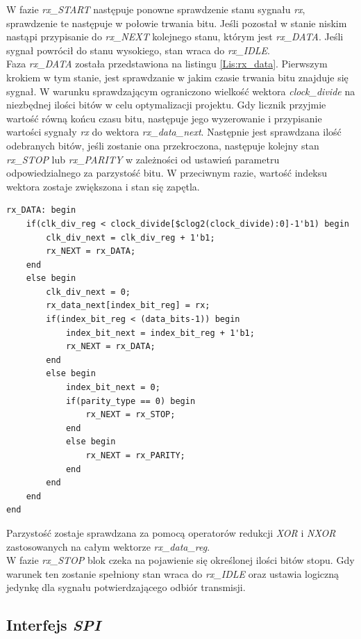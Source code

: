 \documentclass[11pt,a4paper]{article}
\begin{document}
W fazie \textit{rx\_START} następuje ponowne sprawdzenie stanu sygnału \textit{rx}, sprawdzenie te następuje w połowie trwania bitu. Jeśli pozostał w stanie niskim nastąpi przypisanie do \textit{rx\_NEXT} kolejnego stanu, którym jest \textit{rx\_DATA}. Jeśli sygnał powrócił do stanu wysokiego, stan wraca do \textit{rx\_IDLE}.\\
Faza \textit{rx\_DATA} została przedstawiona na listingu \ref{Lis:rx_data}. Pierwszym krokiem w tym stanie, jest sprawdzanie w jakim czasie trwania bitu znajduje się sygnał. W warunku sprawdzającym ograniczono wielkość wektora \textit{clock\_divide} na niezbędnej ilości bitów w celu optymalizacji projektu. Gdy licznik przyjmie wartość  równą końcu czasu bitu, następuje jego wyzerowanie i przypisanie wartości sygnały \textit{rx} do wektora \textit{rx\_data\_next}. Następnie jest sprawdzana ilość odebranych bitów, jeśli zostanie ona przekroczona, następuje kolejny stan \textit{rx\_STOP} lub \textit{rx\_PARITY} w zależności od ustawień parametru odpowiedzialnego za parzystość bitu. W przeciwnym razie, wartość indeksu wektora zostaje zwiększona i stan się zapętla.\\			\begin{minipage}{\textwidth}
\begin{scriptsize}
\begin{lstlisting}[label=Lis:rx_data,caption=Stan \textit{rx\_DATA}]
rx_DATA: begin
	if(clk_div_reg < clock_divide[$clog2(clock_divide):0]-1'b1) begin
		clk_div_next = clk_div_reg + 1'b1;
		rx_NEXT = rx_DATA;
	end
	else begin
		clk_div_next = 0;
		rx_data_next[index_bit_reg] = rx;
		if(index_bit_reg < (data_bits-1)) begin
			index_bit_next = index_bit_reg + 1'b1;
			rx_NEXT = rx_DATA;
		end
		else begin
			index_bit_next = 0;
			if(parity_type == 0) begin
				rx_NEXT = rx_STOP;
			end
			else begin
				rx_NEXT = rx_PARITY;
			end
		end
	end
end
\end{lstlisting}
\end{scriptsize}
\end{minipage}	
Parzystość zostaje sprawdzana za pomocą operatorów redukcji \textit{XOR} i \textit{NXOR} zastosowanych na całym wektorze \textit{rx\_data\_reg}. \\
W fazie \textit{rx\_STOP} blok czeka na pojawienie się określonej ilości bitów stopu. Gdy warunek ten zostanie spełniony stan wraca do \textit{rx\_IDLE} oraz ustawia logiczną jedynkę dla sygnału potwierdzającego odbiór transmisji.

	\subsection{Interfejs \textit{SPI}}
\end{document}
